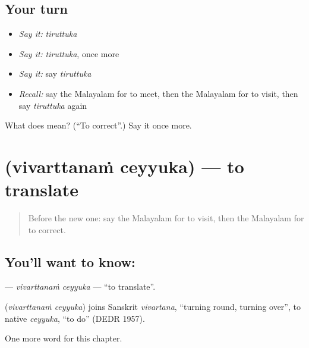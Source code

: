 \subsection*{Your turn}
\begin{itemize}
\raggedright
  \item \emph{Say it:} \emph{tiruttuka}
  \item \emph{Say it:} \emph{tiruttuka}, once more
  \item \emph{Say it:} say \emph{tiruttuka}
  \item \emph{Recall:} say the Malayalam for to meet, then the Malayalam for to visit, then say \emph{tiruttuka} again
\end{itemize}

\begin{tcolorbox}[breakable,colback=teal!4,colframe=teal!35!black,title={Before you move on}]
What does  mean? (\textquotedblleft{}To correct\textquotedblright{}.) Say it once more.
\end{tcolorbox}
\section[\texorpdfstring{\ml{വിവർത്തനം} \ml{ചെയ്യുക} (vivarttanaṁ ceyyuka)}{വിവർത്തനം ചെയ്യുക (vivarttanaṁ ceyyuka)}]{  (vivarttanaṁ ceyyuka) — to translate}

\label{lesson:ML-C306-vivarttanam-ceyyuka}



\begin{quote}
Before the new one: say the Malayalam for to visit, then the Malayalam for to correct.
\end{quote}

\subsection*{You'll want to know:  }
\textbf{ } — \emph{vivarttanaṁ ceyyuka} — \textquotedblleft{}to translate\textquotedblright{}.

\begin{cousinweb}
\textbf{ } (\emph{vivarttanaṁ ceyyuka}) joins Sanskrit \emph{vivartana}, \textquotedblleft{}turning round, turning over\textquotedblright{}, to native \emph{ceyyuka}, \textquotedblleft{}to do\textquotedblright{} (DEDR 1957).
\end{cousinweb}

\begin{grammarlens}[title={What you've built}]
One more word for this chapter.
\end{grammarlens}


